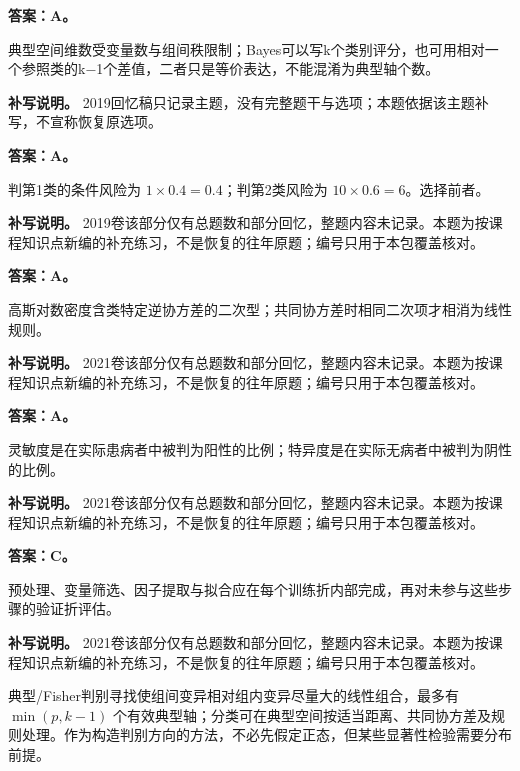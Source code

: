
\textbf{答案：A。}

典型空间维数受变量数与组间秩限制；Bayes可以写k个类别评分，也可用相对一个参照类的k−1个差值，二者只是等价表达，不能混淆为典型轴个数。


\textbf{补写说明。} 2019回忆稿只记录主题，没有完整题干与选项；本题依据该主题补写，不宣称恢复原选项。



\textbf{答案：A。}

判第1类的条件风险为 \(1\times0.4=0.4\)；判第2类风险为 \(10\times0.6=6\)。选择前者。


\textbf{补写说明。} 2019卷该部分仅有总题数和部分回忆，整题内容未记录。本题为按课程知识点新编的补充练习，不是恢复的往年原题；编号只用于本包覆盖核对。



\textbf{答案：A。}

高斯对数密度含类特定逆协方差的二次型；共同协方差时相同二次项才相消为线性规则。


\textbf{补写说明。} 2021卷该部分仅有总题数和部分回忆，整题内容未记录。本题为按课程知识点新编的补充练习，不是恢复的往年原题；编号只用于本包覆盖核对。



\textbf{答案：A。}

灵敏度是在实际患病者中被判为阳性的比例；特异度是在实际无病者中被判为阴性的比例。


\textbf{补写说明。} 2021卷该部分仅有总题数和部分回忆，整题内容未记录。本题为按课程知识点新编的补充练习，不是恢复的往年原题；编号只用于本包覆盖核对。



\textbf{答案：C。}

预处理、变量筛选、因子提取与拟合应在每个训练折内部完成，再对未参与这些步骤的验证折评估。


\textbf{补写说明。} 2021卷该部分仅有总题数和部分回忆，整题内容未记录。本题为按课程知识点新编的补充练习，不是恢复的往年原题；编号只用于本包覆盖核对。



典型/Fisher判别寻找使组间变异相对组内变异尽量大的线性组合，最多有 \(\min(p,k-1)\) 个有效典型轴；分类可在典型空间按适当距离、共同协方差及规则处理。作为构造判别方向的方法，不必先假定正态，但某些显著性检验需要分布前提。

